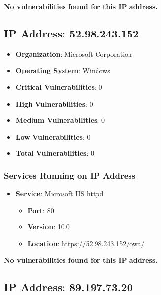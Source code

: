 \documentclass{article}
\begin{document}
\textbf{No vulnerabilities found for this IP address.}




\clearpage



\subsection{IP Address: 52.98.243.152}

\begin{itemize}
    \item \textbf{Organization}: Microsoft Corporation
    \item \textbf{Operating System}:  Windows 
    \item \textbf{Critical Vulnerabilities}: 0
    \item \textbf{High Vulnerabilities}: 0
    \item \textbf{Medium Vulnerabilities}: 0
    \item \textbf{Low Vulnerabilities}: 0
    \item \textbf{Total Vulnerabilities}: 0
\end{itemize}

\subsubsection*{Services Running on IP Address}

\begin{itemize}
    
        \item \textbf{Service}: Microsoft IIS httpd
        \begin{itemize}
            \item \textbf{Port}: 80
            \item \textbf{Version}:  10.0 
            \item \textbf{Location}: \href{ https://52.98.243.152/owa/ }{ https://52.98.243.152/owa/ }
        \end{itemize}
    
\end{itemize}


\textbf{No vulnerabilities found for this IP address.}




\clearpage



\subsection{IP Address: 89.197.73.20}
\end{document}

